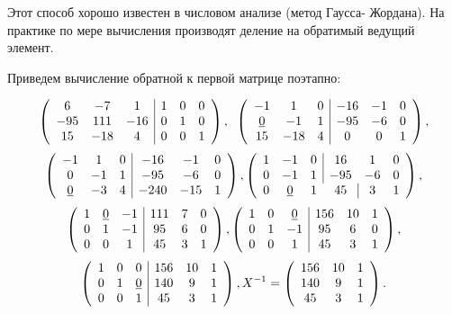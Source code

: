 {Этот способ хорошо известен в числовом анализе (метод Гаусса-
Жордана). На практике по мере вычисления производят деление на
обратимый ведущий элемент.

Приведем вычисление обратной к первой матрице поэтапно:

\[ \left( \begin{array}{cccccc}
6 & -7 & 1 &   \multicolumn{1}{|c}{1} & 0 & 0 \\
-95 & 111 & -16 & \multicolumn{1}{|c}{0} & 1 & 0 \\
15 & -18 & 4 & \multicolumn{1}{|c}{0} & 0 & 1
\end{array} \right),\;\;
\left( \begin{array}{cccccc}
-1 &  1 & 0 & \multicolumn{1}{|c}{-16} & -1 & 0 \\
\underline{0} & -1 & 1 & \multicolumn{1}{|c}{-95} & -6 & 0 \\
15 & -18 & 4 &\multicolumn{1}{|c}{0} & 0 & 1
\end{array} \right), \]
\[ \left( \begin{array}{cccccc}
-1 &  1 & 0 & \multicolumn{1}{|c}{-16} & -1 & 0 \\
0 & -1 & 1 & \multicolumn{1}{|c}{-95} & -6 & 0 \\
\underline{0} & -3 & 4 & \multicolumn{1}{|c}{-240} & -15 & 1
\end{array} \right),
\left( \begin{array}{cccccc}
1 & -1 & 0 & \multicolumn{1}{|c}{16} & 1 & 0 \\
0 & -1 & 1 & \multicolumn{1}{|c}{-95} & -6 & 0 \\
0 & \underline{0} & 1 & 45 & \multicolumn{1}{|c}{3} & 1
\end{array} \right), \]
\[ \left( \begin{array}{cccccc}
1 & \underline{0} & -1 & \multicolumn{1}{|c}{111} & 7 & 0 \\
0 & 1 & -1 & \multicolumn{1}{|c}{95} & 6 & 0 \\
0 & 0 & 1 & \multicolumn{1}{|c}{45} & 3 & 1
\end{array} \right),
\left( \begin{array}{cccccc}
1 &  0 & \underline{0} & \multicolumn{1}{|c}{156} & 10 & 1 \\
0 & 1 & -1 & \multicolumn{1}{|c}{95} & 6 & 0 \\
0 & 0 & 1 & \multicolumn{1}{|c}{45} & 3 & 1
\end{array} \right), \]
\[ \left( \begin{array}{cccccc}
1 &  0 & 0 & \multicolumn{1}{|c}{156} & 10 & 1 \\
0 & 1 & \underline{0} & \multicolumn{1}{|c}{140} & 9 & 1 \\
0 & 0 & 1 & \multicolumn{1}{|c}{45} & 3 & 1
\end{array} \right),
X^{-1} = {\left( \begin{array}{ccc}
156 & 10 & 1 \\
140 & 9 & 1  \\
45 & 3 & 1
\end{array} \right).} \]

}
